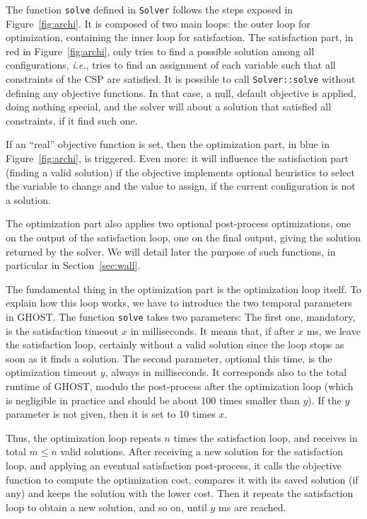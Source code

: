 \documentclass[journal]{IEEEtran}
\newcommand{\csp}{\textsc{CSP}\xspace}
\newcommand{\ghost}{\textsc{GHOST}\xspace}
\newcommand{\ie}{\textit{i.e.}}
\begin{document}
The  function \texttt{solve}  defined in  \texttt{Solver} follows  the
steps exposed  in Figure~\ref{fig:archi}. It  is composed of  two main
loops: the outer loop for  optimization, containing the inner loop for
satisfaction.      The     satisfaction     part,    in     red     in
Figure~\ref{fig:archi}, only  tries to find a  possible solution among
all configurations, \ie, tries to  find an assignment of each variable
such that all constraints of the \csp are satisfied. It is possible to
call \texttt{Solver::solve} without  defining any objective functions.
In  that case,  a null,  default objective  is applied,  doing nothing
special,  and the  solver will  about  a solution  that satisfied  all
constraints, if it find such one.

If an ``real'' objective function  is set, then the optimization part,
in blue  in Figure~\ref{fig:archi}, is  triggered. Even more:  it will
influence  the satisfaction  part (finding  a valid  solution) if  the
objective  implements optional  heuristics to  select the  variable to
change and the value to assign,  if the current configuration is not a
solution.

The  optimization   part  also   applies  two   optional  post-process
optimizations, one on the output of  the satisfaction loop, one on the
final output,  giving the  solution returned by  the solver.   We will
detail  later  the  purpose  of   such  functions,  in  particular  in
Section~\ref{sec:wall}.

The fundamental  thing in  the optimization  part is  the optimization
loop itself. To explain how this  loop works, we have to introduce the
two temporal  parameters in \ghost. The  function \texttt{solve} takes
two parameters: The first one,  mandatory, is the satisfaction timeout
$x$ in  milliseconds.  It means  that, if after  $x$ ms, we  leave the
satisfaction loop, certainly  without a valid solution  since the loop
stops as soon  as it finds a solution. The  second parameter, optional
this time, is the optimization timeout $y$, always in milliseconds. It
corresponds  also  to   the  total  runtime  of   \ghost,  modulo  the
post-process  after  the optimization  loop  (which  is negligible  in
practice and should  be about 100 times smaller than  $y$). If the $y$
parameter is not given, then it is set to 10 times $x$.

Thus, the optimization  loop repeats $n$ times  the satisfaction loop,
and receives  in total $m \leq  n$ valid solutions. After  receiving a
new  solution for  the  satisfaction loop,  and  applying an  eventual
satisfaction post-process, it calls  the objective function to compute
the optimization  cost, compares it  with its saved solution  (if any)
and  keeps the  solution with  the lower  cost.  Then  it repeats  the
satisfaction loop  to obtain a new  solution, and so on,  until $y$ ms
are reached.
\end{document}
